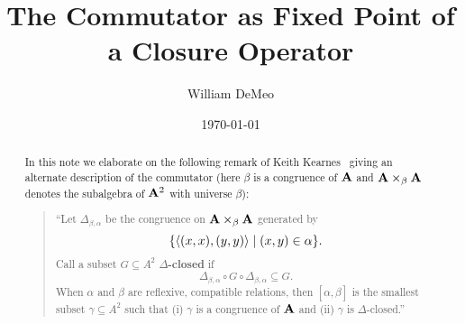 



\usepackage{inputs/macros}



\title[Commutator as Fixed Point]{The Commutator as Fixed Point of a Closure Operator}
\date{\today}
\author[W.~DeMeo]{William DeMeo}
\address{University of Hawaii}


\maketitle

\renewcommand{\etaR}{\ensuremath{\eta}}



\begin{abstract}
  In this note we elaborate on the following remark of Keith
  Kearnes~\cite[p.~930]{MR1358491}
  giving an alternate description of the commutator %
  (here $\beta$ is a congruence of $\mathbf{A}$ and $\mathbf{A} \times_\beta \mathbf{A}$ denotes the subalgebra of
  $\mathbf{A}^2$ with universe $\beta$):
  \begin{quote}
  ``Let $\Delta_{\beta,\alpha}$ be the congruence on $\mathbf{A} \times_\beta \mathbf{A}$ generated by
  \[\{\langle(x, x), (y, y)\rangle \mid (x, y) \in \alpha\}.\]
  Call a subset $G \subseteq A^2$ {\bf $\Delta$-closed} if
  \[
  \Delta_{\beta,\alpha}\circ G \circ \Delta_{\beta,\alpha} \subseteq G.
  \]
  When $\alpha$ and $\beta$ are reflexive, compatible relations, then $[\alpha, \beta]$
  is the smallest subset $\gamma \subseteq A^2$ such that (i) $\gamma$
  is a congruence of $\mathbf{A}$ and (ii) $\gamma$ is $\Delta$-closed.''
  \end{quote}
\end{abstract}


